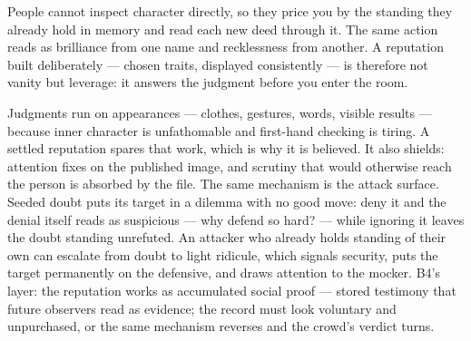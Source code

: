 


\begin{core}
People cannot inspect character directly, so they price you by the standing they already hold in memory and read each new deed through it. The same action reads as brilliance from one name and recklessness from another. A reputation built deliberately --- chosen traits, displayed consistently --- is therefore not vanity but leverage: it answers the judgment before you enter the room.
\end{core}

\begin{mechanism}
Judgments run on appearances --- clothes, gestures, words, visible results --- because inner character is unfathomable and first-hand checking is tiring. A settled reputation spares that work, which is why it is believed. It also shields: attention fixes on the published image, and scrutiny that would otherwise reach the person is absorbed by the file. The same mechanism is the attack surface. Seeded doubt puts its target in a dilemma with no good move: deny it and the denial itself reads as suspicious --- why defend so hard? --- while ignoring it leaves the doubt standing unrefuted. An attacker who already holds standing of their own can escalate from doubt to light ridicule, which signals security, puts the target permanently on the defensive, and draws attention to the mocker. B4's layer: the reputation works as accumulated social proof --- stored testimony that future observers read as evidence; the record must look voluntary and unpurchased, or the same mechanism reverses and the crowd's verdict turns.
\end{mechanism}

